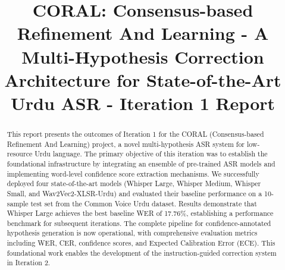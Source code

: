\documentclass{fast-nuces-bs}
\title{CORAL: Consensus-based Refinement And Learning - A Multi-Hypothesis Correction Architecture for State-of-the-Art Urdu ASR - Iteration 1 Report}
\begin{document}
\begin{abstract}
This report presents the outcomes of Iteration 1 for the CORAL (Consensus-based Refinement And Learning) project, a novel multi-hypothesis ASR system for low-resource Urdu language. The primary objective of this iteration was to establish the foundational infrastructure by integrating an ensemble of pre-trained ASR models and implementing word-level confidence score extraction mechanisms. We successfully deployed four state-of-the-art models (Whisper Large, Whisper Medium, Whisper Small, and Wav2Vec2-XLSR-Urdu) and evaluated their baseline performance on a 10-sample test set from the Common Voice Urdu dataset. Results demonstrate that Whisper Large achieves the best baseline WER of 17.76\%, establishing a performance benchmark for subsequent iterations. The complete pipeline for confidence-annotated hypothesis generation is now operational, with comprehensive evaluation metrics including WER, CER, confidence scores, and Expected Calibration Error (ECE). This foundational work enables the development of the instruction-guided correction system in Iteration 2.
\end{abstract}







 

\appendix

\end{document}
